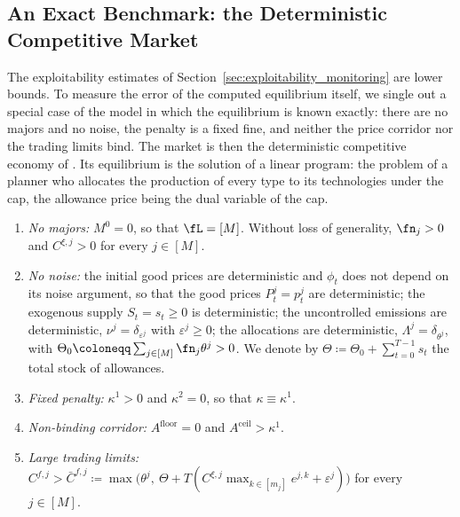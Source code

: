 
    \subsection{An Exact Benchmark: the Deterministic Competitive Market}
    \label{sec:benchmark_lp}

    The exploitability estimates of Section~\ref{sec:exploitability_monitoring} are lower bounds. To measure the error of the computed equilibrium itself, we single out a special case of the model in which the equilibrium is known exactly: there are no majors and no noise, the penalty is a fixed fine, and neither the price corridor nor the trading limits bind. The market is then the deterministic competitive economy of \citet{montgomery_markets_1972}. Its equilibrium is the solution of a linear program: the problem of a planner who allocates the production of every type to its technologies under the cap, the allowance price being the dual variable of the cap.

    \begin{assumption}
        \label{ass:benchmark}
        \leavevmode
        \begin{enumerate}
            \item \emph{No majors:} $M^0 = 0$, so that $\fL = [M]$. Without loss of generality, $\fn_j > 0$ and $C^{\xi,j} > 0$ for every $j \in [M]$.
            \item \emph{No noise:} the initial good prices are deterministic and $\phi_t$ does not depend on its noise argument, so that the good prices $P^j_t = p^j_t$ are deterministic; the exogenous supply $S_t = s_t \ge 0$ is deterministic; the uncontrolled emissions are deterministic, $\nu^j = \delta_{\varepsilon^j}$ with $\varepsilon^j \ge 0$; the allocations are deterministic, $\Lambda^j = \delta_{\theta^j}$, with $\Theta_0 \coloneqq \sum_{j \in [M]} \fn_j \theta^j > 0$. We denote by $\Theta \coloneqq \Theta_0 + \sum_{t=0}^{T-1} s_t$ the total stock of allowances.
            \item \emph{Fixed penalty:} $\kappa^1 > 0$ and $\kappa^2 = 0$, so that $\kappa \equiv \kappa^1$.
            \item \emph{Non-binding corridor:} $A^{\mathrm{floor}} = 0$ and $A^{\mathrm{ceil}} > \kappa^1$.
            \item \emph{Large trading limits:} $C^{f,j} > \bar C^{f,j} \coloneqq \max\big(\theta^j,\ \Theta + T(C^{\xi,j} \max_{k \in [m_j]} e^{j,k} + \varepsilon^j)\big)$ for every $j \in [M]$.
        \end{enumerate}
    \end{assumption}

